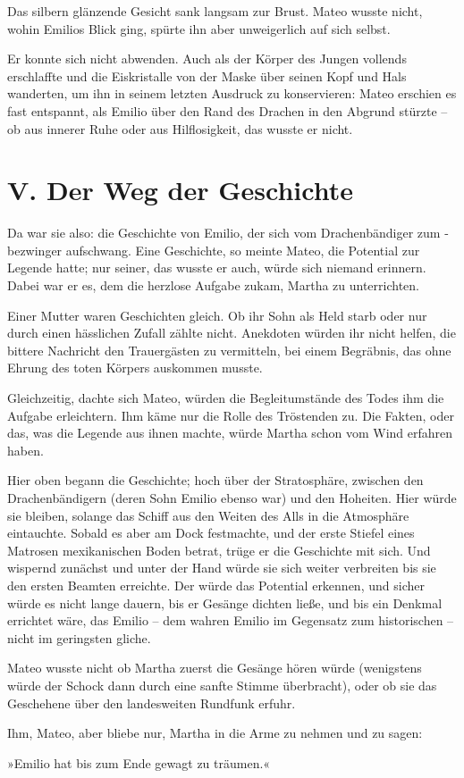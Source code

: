 Das silbern glänzende Gesicht sank langsam zur Brust. Mateo wusste
nicht, wohin Emilios Blick ging, spürte ihn aber unweigerlich auf
sich selbst.

Er konnte sich nicht abwenden. Auch als der Körper des Jungen
vollends erschlaffte und die Eiskristalle von der Maske über seinen
Kopf und Hals wanderten, um ihn in seinem letzten Ausdruck zu
konservieren: Mateo erschien es fast entspannt, als Emilio über den
Rand des Drachen in den Abgrund stürzte – ob aus innerer Ruhe oder
aus Hilflosigkeit, das wusste er nicht.

\section{V. Der Weg der Geschichte}

Da war sie also: die Geschichte von Emilio, der sich vom
Drachenbändiger zum -bezwinger aufschwang. Eine Geschichte, so
meinte Mateo, die Potential zur Legende hatte; nur seiner, das
wusste er auch, würde sich niemand erinnern. Dabei war er es, dem
die herzlose Aufgabe zukam, Martha zu unterrichten.

Einer Mutter waren Geschichten gleich. Ob ihr Sohn als Held starb
oder nur durch einen hässlichen Zufall zählte nicht. Anekdoten
würden ihr nicht helfen, die bittere Nachricht den Trauergästen zu
vermitteln, bei einem Begräbnis, das ohne Ehrung des toten Körpers
auskommen musste.

Gleichzeitig, dachte sich Mateo, würden die Begleitumstände des
Todes ihm die Aufgabe erleichtern. Ihm käme nur die Rolle des
Tröstenden zu. Die Fakten, oder das, was die Legende aus ihnen
machte, würde Martha schon vom Wind erfahren haben.

\bigpar

Hier oben begann die Geschichte; hoch über der Stratosphäre,
zwischen den Drachenbändigern (deren Sohn Emilio ebenso war) und
den Hoheiten. Hier würde sie bleiben, solange das Schiff aus den
Weiten des Alls in die Atmosphäre eintauchte. Sobald es aber am
Dock festmachte, und der erste Stiefel eines Matrosen mexikanischen
Boden betrat, trüge er die Geschichte mit sich. Und wispernd
zunächst und unter der Hand würde sie sich weiter verbreiten bis
sie den ersten Beamten erreichte. Der würde das Potential erkennen,
und sicher würde es nicht lange dauern, bis er Gesänge dichten
ließe, und bis ein Denkmal errichtet wäre, das Emilio – dem wahren
Emilio im Gegensatz zum historischen – nicht im geringsten gliche.

\bigpar

Mateo wusste nicht ob Martha zuerst die Gesänge hören würde
(wenigstens würde der Schock dann durch eine sanfte Stimme
überbracht), oder ob sie das Geschehene über den landesweiten
Rundfunk erfuhr.

\bigpar

Ihm, Mateo, aber bliebe nur, Martha in die Arme zu nehmen und zu
sagen:

\bigpar

»Emilio hat bis zum Ende gewagt zu träumen.«


